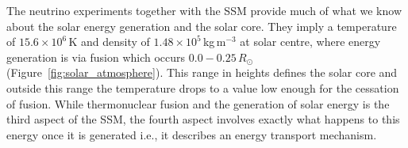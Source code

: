 The neutrino experiments together with the SSM provide much of what we know about the solar energy generation and the solar core. They imply a temperature of $15.6\times10^6$\,K and density of $1.48\times10^5$\,kg\,m$^{-3}$ at solar centre, where energy generation is via fusion which occurs $0.0-0.25\,R_{\odot}$ (Figure~\ref{fig:solar_atmosphere}). This range in heights defines the solar core and outside this range the temperature drops to a value low enough for the cessation of fusion. While thermonuclear fusion and the generation of solar energy is the third aspect of the SSM, the fourth aspect involves exactly what happens to this energy once it is generated i.e., it describes an energy transport mechanism.


